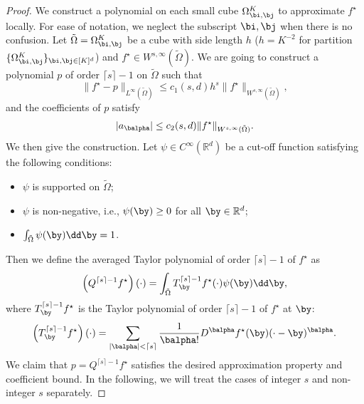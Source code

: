 \documentclass[11pt]{article}
\begin{document}
\begin{proof}
    We construct a polynomial on each small cube $\Omega^{K}_{\bi,\bj}$ to approximate $f^{\star}$ locally. For ease of notation, we neglect the subscript $\bi,\bj$ when there is no confusion. Let $\tilde{\Omega}=\Omega_{\bi,\bj}^K$ be a cube with side length $h$ ($h = K^{-2}$ for partition $\{\Omega^{K}_{\bi,\bj}\}_{\bi,\bj \in [K]^d}$) and $f^{\star} \in W^{s,\infty}(\tilde{\Omega})$. We are going to construct a polynomial $p$ of order $\lceil s \rceil -1$ on $\tilde{\Omega}$ such that
    \begin{equation*}
        \|f^{\star} - p\|_{L^\infty(\tilde{\Omega})} \leq c_1(s,d) h^{s} \|f^{\star}\|_{W^{s,\infty}(\tilde{\Omega})},
    \end{equation*}
    and the coefficients of $p$ satisfy
    \begin{equation*}
        |a_{\balpha}| \leq c_2(s,d) \|f^{\star}\|_{W^{s,\infty}(\tilde{\Omega})}.
    \end{equation*}
     We then give the construction. Let $\psi \in C^\infty(\mathbb{R}^d)$ be a cut-off function satisfying the following conditions:
    \begin{itemize}
        \item $\psi$ is supported on $\tilde{\Omega}$;
        \item $\psi$ is non-negative, i.e., $\psi(\by) \geq 0$ for all $\by\in \mathbb{R}^d$;
        \item $\int_{\tilde{\Omega}} \psi(\by) \dd \by = 1$.
    \end{itemize}
    Then we define the averaged Taylor polynomial of order $\lceil s \rceil -1$ of $f^{\star}$ as
    \begin{equation*}
        \left(Q^{\lceil s \rceil -1} f^{\star} \right)(\cdot) = \int_{\tilde{\Omega}} T^{\lceil s \rceil -1}_{\by} f^{\star}(\cdot) \psi(\by) \dd \by,
    \end{equation*}
     where $T^{\lceil s \rceil -1}_{\by} f^{\star}$ is the Taylor polynomial of order $\lceil s \rceil -1$ of $f^{\star}$ at $\by$:
     \begin{equation*}
         \left(T_{\by}^{\lceil s \rceil -1} f^{\star} \right)(\cdot) = \sum_{|{\balpha}| < \lceil s \rceil} \frac{1}{{\balpha}!} D^{\balpha} f^{\star}(\by) (\cdot - \by)^{\balpha}.
     \end{equation*}
     We claim that $p= Q^{\lceil s \rceil -1} f^{\star}$ satisfies the desired approximation property and coefficient bound. In the following, we will treat the cases of integer $s$ and non-integer $s$ separately.


\end{proof}
\end{document}
